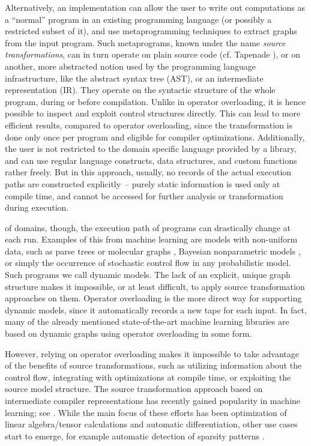 Alternatively, an implementation can allow the user to write out computations as a \enquote{normal}
program in an existing programming language (or possibly a restricted subset of it), and use
metaprogramming techniques to extract graphs from the input program.  Such metaprograms, known under
the name \emph{source transformations}, can in turn operate on plain source code (cf. Tapenade
\parencite{tapenadedevelopers2019tapenade}), or on another, more abstracted notion used by the
programming language infrastructure, like the abstract syntax tree (AST), or an intermediate
representation (IR).  They operate on the syntactic structure of the whole program, during or before
compilation.  Unlike in operator overloading, it is hence possible to inspect and exploit control
structures directly. This can lead to more efficient results, compared to operator overloading,
since the transformation is done only once per program and eligible for compiler optimizations.
Additionally, the user is not restricted to the domain specific language provided by a library, and
can use regular language constructs, data structures, and custom functions rather freely.  But in
this approach, usually, no records of the actual execution paths are constructed explicitly~--
purely static information is used only at compile time, and cannot be accessed for further analysis
or transformation during execution.

 of domains, though, the execution path of programs can drastically change
at each run.  Examples of this from machine learning are models with non-uniform data, such as parse
trees \parencite{socher2011parsing} or molecular graphs \parencite{bianucci2000application},
Bayesian nonparametric models \parencite{hjort2010bayesian}, or simply the occurrence of stochastic
control flow in any probabilistic model.  Such programs we call dynamic models.  The lack of an
explicit, unique graph structure makes it impossible, or at least difficult, to apply source
transformation approaches on them.  Operator overloading is the more direct way for supporting
dynamic models, since it automatically records a new tape for each input. In fact, many of the
already mentioned state-of-the-art machine learning libraries are based on dynamic graphs using
operator overloading in some form.

However, relying on operator overloading makes it impossible to take advantage of the benefits of
source transformations, such as utilizing information about the control flow, integrating with
optimizations at compile time, or exploiting the source model structure.  The source transformation
approach based on intermediate compiler representations has recently gained popularity in machine
learning; see \textcite{bradbury2018jax,lattner2020mlir}.  While the main focus of these efforts has
been optimization of linear algebra/tensor calculations and automatic differentiation, other use
cases start to emerge, for example automatic detection of sparsity patterns
\parencite{gowda2019sparsity}.

